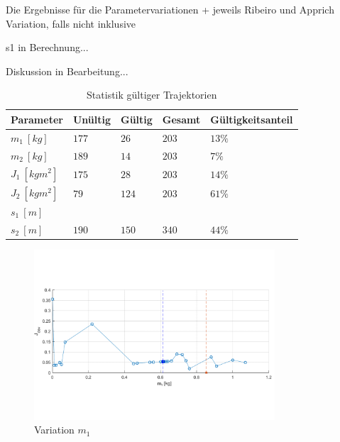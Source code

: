 Die Ergebnisse für die Parametervariationen + jeweils Ribeiro und Apprich Variation, falls nicht inklusive

s1 in Berechnung...

Diskussion in Bearbeitung...

\begin{table}[h]
	\centering
	\caption{Statistik gültiger Trajektorien}
		\begin{tabular}{lllll}
			\toprule
			Parameter  & Unültig & Gültig & Gesamt & Gültigkeitsanteil \\
			\midrule
			$m_1 \ [\unit{kg}]$     & $177$ & $26$    & $203$   & $13 \% $ \\
			$m_2 \ [\unit{kg}]$     & $189$ & $14$    & $203$   & $7 \% $ \\
			$J_1 \ [\unit{kg m^2}]$  & $175$ & $28$    & $203$   & $14 \%$ \\
			$J_2 \ [\unit{kg m^2}]$  & $79$  & $124$   & $203$   & $61 \%$ \\
			$s_1 \ [\unit{m}]$      &    & &   &  \\
			$s_2 \ [\unit{m}]$      & $190$ & $150$   & $340$  & $44 \%$ \\
			\bottomrule
		\end{tabular}
	\label{tab:statTrj}
\end{table}


\begin{figure}
	\centering
		\includegraphics[width=0.8\textwidth]{Bilder/Trajektorien/m1.pdf}
	\caption{Variation $m_1$}
	\label{fig:m1} %
\end{figure}

